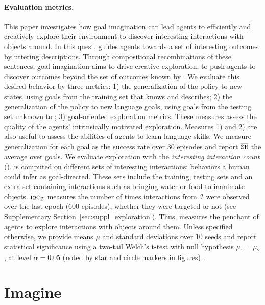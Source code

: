 \paragraph{Evaluation metrics.} This paper investigates how goal imagination can lead agents to efficiently and creatively explore their environment to discover interesting interactions with objects around. In this quest, \SP guides agents towards a set of interesting outcomes by uttering \NL descriptions. Through compositional recombinations of these sentences, goal imagination aims to drive creative exploration, to push agents to discover outcomes beyond the set of outcomes known by \SP. We evaluate this desired behavior by three metrics: 1) the generalization of the policy to new states, using goals from the training set that \SP knows and describes; 2) the generalization of the policy to new language goals, using goals from the testing set unknown to \SP; 3) goal-oriented exploration metrics. These measures assess the quality of the agents' intrinsically motivated exploration. Measures 1) and 2) are also useful to assess the abilities of agents to learn language skills. We measure generalization for each goal as the success rate over $30$ episodes and report $\overline{\mathtt{SR}}$ the average over goals. We evaluate exploration with the \textit{interesting interaction count} (\itwoc). \itwoc is computed on different sets of interesting interactions: behaviors a human could infer as goal-directed. These sets include the training, testing sets and an extra set containing interactions such as bringing water or food to inanimate objects. $\itwoc_\mathcal{I}$ measures the number of times interactions from $\mathcal{I}$ were observed over the last epoch ($600$ episodes), whether they were targeted or not (see Supplementary Section~\ref{sec:suppl_exploration}). Thus, \itwoc measures the penchant of agents to explore interactions with objects around them. Unless specified  otherwise, we provide means $\mu$ and standard deviations over $10$ seeds and report statistical significance using a two-tail Welch's t-test with null hypothesis $\mu_1=\mu_2$, at level $\alpha=0.05$ (noted by star and circle markers in figures) \cite{colas2019hitchhiker}.

\section{Imagine}

\label{sec:methods}

